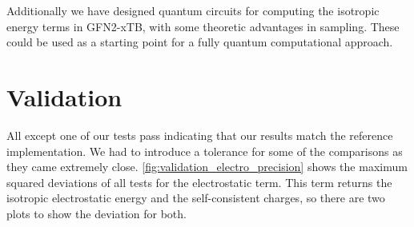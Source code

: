 Additionally we have designed quantum circuits for computing the isotropic energy terms in GFN2-xTB, with some theoretic advantages in sampling. These could be used as a starting point for a fully quantum computational approach. 

\section{Validation}

All except one of our tests pass indicating that our results match the reference implementation. We had to introduce a tolerance for some of the comparisons as they came extremely close. \autoref{fig:validation_electro_precision} shows the maximum squared deviations of all tests for the electrostatic term. This term returns the isotropic electrostatic energy and the self-consistent charges, so there are two plots to show the deviation for both.

